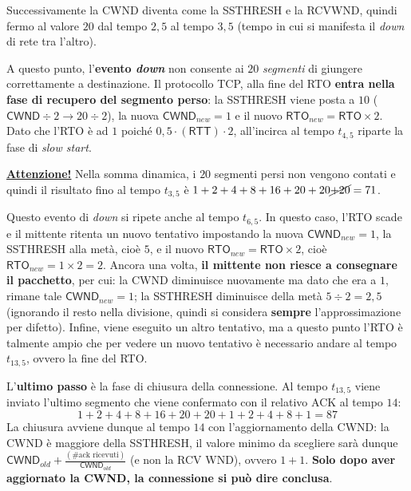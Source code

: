 \documentclass[a4paper]{article}
\begin{document}
	\noindent
	Successivamente la \textsf{CWND} diventa come la \textsf{SSTHRESH} e la \textsf{RCVWND}, quindi fermo al valore $20$ dal tempo $2,5$ al tempo $3,5$ (tempo in cui si manifesta il \emph{down} di rete tra l’altro).\newline
	
	\noindent
	A questo punto, l’\textbf{evento \emph{down}} non consente ai $20$ \emph{segmenti} di giungere correttamente a destinazione. Il protocollo TCP, alla fine del \textsf{RTO} \textbf{entra nella fase di recupero del segmento perso}: la \textsf{SSTHRESH} viene posta a $10$ ($\textsf{CWND} \div 2 \rightarrow 20 \div 2$), la nuova $\textsf{CWND}_{new} = 1$ e il nuovo $\textsf{RTO}_{new} = \textsf{RTO} \times 2$. Dato che l’\textsf{RTO} è ad $1$ poiché $0,5 \cdot \left(\textsf{RTT}\right) \cdot 2$, all’incirca al tempo $t_{4,5}$ riparte la fase di \emph{slow start}.\newline
	
	\noindent
	\textbf{\underline{Attenzione!}} Nella somma dinamica, i $20$ segmenti persi non vengono contati e quindi il risultato fino al tempo $t_{3,5}$ è $1+2+4+8+16+20+20\cancel{+20}=71$.\newline
	
	\noindent
	Questo evento di \emph{down} si ripete anche al tempo $t_{6,5}$. In questo caso, l’\textsf{RTO} scade e il mittente ritenta un nuovo tentativo impostando la nuova $\textsf{CWND}_{new} = 1$, la \textsf{SSTHRESH} alla metà, cioè $5$, e il nuovo $\textsf{RTO}_{new} = \textsf{RTO} \times 2$, cioè $\textsf{RTO}_{new} = 1 \times 2 = 2$. Ancora una volta, \textbf{il mittente non riesce a consegnare il pacchetto}, per cui: la \textsf{CWND} diminuisce nuovamente ma dato che era a $1$, rimane tale $\textsf{CWND}_{new}=1$; la \textsf{SSTHRESH} diminuisce della metà $5 \div 2 = 2,5$ (ignorando il resto nella divisione, quindi si considera \textbf{sempre} l'approssimazione per difetto). Infine, viene eseguito un altro tentativo, ma a questo punto l’\textsf{RTO} è talmente ampio che per vedere un nuovo tentativo è necessario andare al tempo $t_{13,5}$, ovvero la fine del \textsf{RTO}.\newpage
	
	\noindent
	L’\textbf{ultimo passo} è la fase di chiusura della connessione. Al tempo $t_{13,5}$ viene inviato l’ultimo segmento che viene confermato con il relativo \textsf{ACK} al tempo $14$:
	\begin{equation*}
		1+2+4+8+16+20+20+1+2+4+8+1=87
	\end{equation*}
	La chiusura avviene dunque al tempo $14$ con l’aggiornamento della \textsf{CWND}: la \textsf{CWND} è maggiore della \textsf{SSTHRESH}, il valore minimo da scegliere sarà dunque $\textsf{CWND}_{old} + \frac{\left(\text{\#ack ricevuti}\right)}{\textsf{CWND}_{old}}$ (e non la \textsf{RCV WND}), ovvero $1+1$. \textbf{Solo dopo aver aggiornato la \textsf{CWND}, la connessione si può dire conclusa}.\newpage
	
\end{document}
